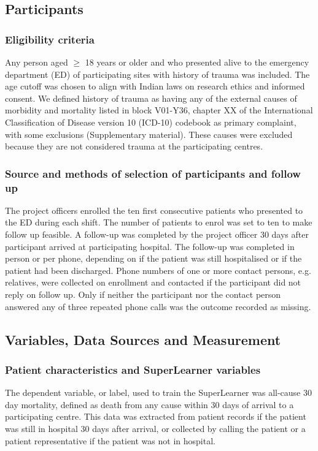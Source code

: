 \documentclass[10pt,letterpaper]{article}\usepackage[]{graphicx}\usepackage[]{color}
\begin{document}
\subsection*{Participants}
\subsubsection*{Eligibility criteria}
Any person aged $\geq$ 18 years or older and who presented alive to the
emergency department (ED) of participating sites with history of trauma was
included. The age cutoff was chosen to align with Indian laws on research ethics
and informed consent. We defined history of trauma as having any of the external
causes of morbidity and mortality listed in block V01-Y36, chapter XX of the
International Classification of Disease version 10 (ICD-10) codebook as primary
complaint, with some exclusions (Supplementary material). These causes were
excluded because they are not considered trauma at the participating centres.

\subsubsection*{Source and methods of selection of participants and follow up}
The project officers enrolled the ten first consecutive patients who presented
to the ED during each shift. The number of patients to enrol was set to ten to
make follow up feasible. A follow-up was completed by the project officer 30
days after participant arrived at participating hospital. The follow-up was
completed in person or per phone, depending on if the patient was still
hospitalised or if the patient had been discharged. Phone numbers of one or more
contact persons, e.g. relatives, were collected on enrollment and contacted if
the participant did not reply on follow up. Only if neither the participant nor
the contact person answered any of three repeated phone calls was the outcome
recorded as missing.

\subsection*{Variables, Data Sources and Measurement}
\subsubsection*{Patient characteristics and SuperLearner variables}
The dependent variable, or label, used to train the SuperLearner was all-cause
30 day mortality, defined as death from any cause within 30 days of arrival to a
participating centre. This data was extracted from patient records if the
patient was still in hospital 30 days after arrival, or collected by calling the
patient or a patient representative if the patient was not in hospital.
\end{document}
